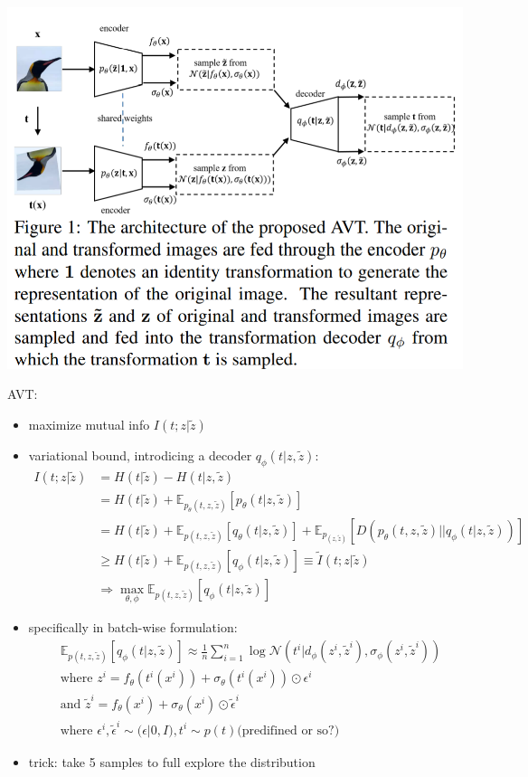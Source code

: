 \documentclass{article}
\begin{document}
    \centerline{\includegraphics[width=0.8\paperwidth]{avt-arch.PNG}}
    AVT: \begin{itemize}
        \item maximize mutual info $I(t;z|\tilde z)$
        \item variational bound, introdicing a decoder $q_\phi(t|z, \tilde z)$:
            \begin{align}
                I(t;z|\tilde z) &= H(t|\tilde z) - H(t|z, \tilde z)\\
                &= H(t|\tilde z) + \mathbb E_{p_\theta(t, z, \tilde z)}[p_\theta(t|z,\tilde z)]\\
                &= H(t|\tilde z) + \mathbb E_{p(t, z, \tilde z)}[q_\theta(t|z,\tilde z)] + \mathbb E_{p_(z, \tilde z)}[D(p_\theta(t, z, \tilde z)||q_\phi(t|z,\tilde z))]\\
                &\ge H(t|\tilde z) + \mathbb E_{p(t, z, \tilde z)}[q_\phi(t|z,\tilde z)]\equiv \tilde I(t;z|\tilde z)\\
                &\Rightarrow \max_{\theta,\phi} \mathbb E_{p(t, z, \tilde z)}[q_\phi(t|z,\tilde z)]
            \end{align}
        \item specifically in batch-wise formulation:\begin{align}
            &\mathbb E_{p(t, z, \tilde z)}[q_\phi(t|z,\tilde z)]\approx \frac 1 n \sum_{i=1}^n \log \mathcal N(t^i|d_\phi(z^i, \tilde z^i), \sigma_\phi(z^i, \tilde z^i))\\
            &\text{where }z^i=f_\theta(t^i(x^i))+ \sigma_\theta(t^i(x^i))\odot \epsilon^i\\
            &\text{and }\tilde z^i=f_\theta(x^i)+ \sigma_\theta(x^i)\odot \tilde \epsilon^i\\
            &\text{where }\epsilon^i, \tilde \epsilon^i \sim \mathcal(\epsilon|0,I), t^i\sim p(t)\text{(predifined or so?)}
        \end{align}
        \item trick: take 5 samples to full explore the distribution 
    \end{itemize}
\end{document}
